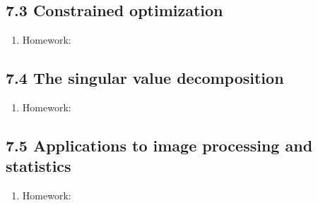 \documentclass{article}
\begin{document}
\subsection{7.3 Constrained optimization}

\begin{enumerate}

\item Homework: 

\end{enumerate}

\subsection{7.4 The singular value decomposition}

\begin{enumerate}

\item Homework: 

\end{enumerate}

\subsection{7.5 Applications to image processing and statistics}

\begin{enumerate}

\item Homework: 

\end{enumerate}
\end{document}
